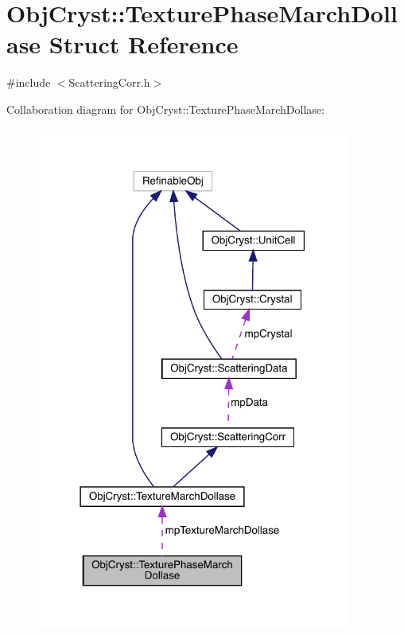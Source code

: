\hypertarget{struct_obj_cryst_1_1_texture_phase_march_dollase}{}\section{Obj\+Cryst\+::Texture\+Phase\+March\+Dollase Struct Reference}
\label{struct_obj_cryst_1_1_texture_phase_march_dollase}


{\ttfamily \#include $<$Scattering\+Corr.\+h$>$}



Collaboration diagram for Obj\+Cryst\+::Texture\+Phase\+March\+Dollase\+:
\nopagebreak
\begin{figure}[H]
\begin{center}
\leavevmode
\includegraphics[width=291pt]{struct_obj_cryst_1_1_texture_phase_march_dollase__coll__graph}
\end{center}
\end{figure}
